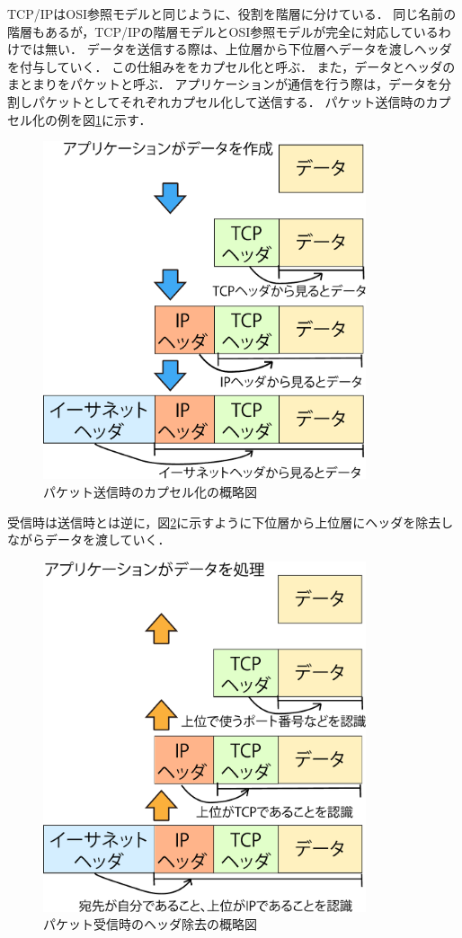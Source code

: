 \documentclass[12pt,a4j,titlepage]{ltjsarticle}
\begin{document}
TCP/IPはOSI参照モデルと同じように、役割を階層に分けている．
同じ名前の階層もあるが，TCP/IPの階層モデルとOSI参照モデルが完全に対応しているわけでは無い．
データを送信する際は、上位層から下位層へデータを渡しヘッダを付与していく．
この仕組みををカプセル化と呼ぶ．
また，データとヘッダのまとまりをパケットと呼ぶ．
アプリケーションが通信を行う際は，データを分割しパケットとしてそれぞれカプセル化して送信する．
パケット送信時のカプセル化の例を図\ref{fig:capu}に示す．
\clearpage
\begin{figure}[h]
\centering
\includegraphics[clip,width=95mm]{figures/capu.pdf}
\caption[パケット送信時のカプセル化の概略図]{パケット送信時のカプセル化の概略図\linebreak}
\label{fig:capu}
\end{figure}

受信時は送信時とは逆に，図\ref{fig:capu2}に示すように下位層から上位層にヘッダを除去しながらデータを渡していく．

\begin{figure}[h]
\centering
\includegraphics[clip,width=95mm]{figures/capu2.pdf}
\caption[パケット受信時のヘッダ除去の概略図]{パケット受信時のヘッダ除去の概略図\linebreak}
\label{fig:capu2}
\end{figure}
\end{document}
